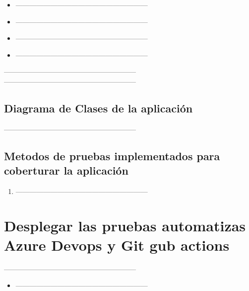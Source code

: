\documentclass[preprint,12pt]{elsarticle}
\begin{document}
\begin{itemize}
\item ---------------------------------------------------------
	\item ---------------------------------------------------------
	\item 	---------------------------------------------------------

	\item ---------------------------------------------------------
	\end{itemize}
	---------------------------------------------------------
	---------------------------------------------------------
\subsection{\textbf{ Diagrama de Clases de la aplicación }}
---------------------------------------------------------

\subsection{\textbf{  Metodos de pruebas implementados para coberturar la aplicación }}
\renewcommand{\labelenumi}{{\theenumi})}
\begin{enumerate}

\item ---------------------------------------------------------
\end{enumerate}
\section{Desplegar las pruebas automatizas  Azure Devops y Git gub actions }
---------------------------------------------------------
\begin{itemize} 
    \item ---------------------------------------------------------

\end{itemize}
	\newpage
	
		
\end{document}
